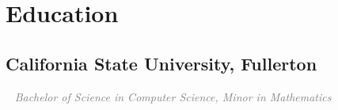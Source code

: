 \documentclass{article}
\newcommand{\resumesection}[3]{
    \subsection*{#1}
    \ 
    \normalsize
    \normalsize
    \hfill
    \textcolor{black}{#3}
    \normalsize
    \newline
    \small
    \textcolor{grey}{\emph{#2}}
}
\begin{document}
\section*{Education}
\resumesection{California State University, Fullerton}{Bachelor of Science in Computer Science, Minor in Mathematics}{}
\end{document}
